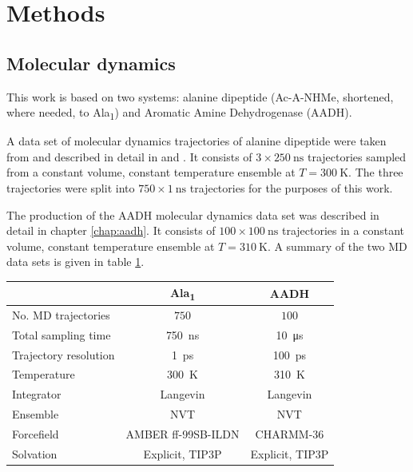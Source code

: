 
\section{Methods}\label{sec:methods}
\subsection{Molecular dynamics}
This work is based on two systems: alanine dipeptide (Ac-A-NHMe, shortened, where needed, to Ala\textsubscript{1}) and Aromatic Amine Dehydrogenase (AADH). 

 A data set of molecular dynamics trajectories of alanine dipeptide were taken from \cite{wehmeyerTimelaggedAutoencodersDeep2018a} and described in detail in \cite{nuskeMarkovStateModels2017b} and \cite{harveyACEMDAcceleratingBiomolecular2009}.  It consists of $3\times \SI{250}{\nano\second}$ trajectories sampled from a constant volume, constant temperature ensemble at $T=\SI{300}{\kelvin}$. The three trajectories were split into $750\times\SI{1}{\nano\second}$ trajectories for the purposes of this work. 
 
The production of the AADH molecular dynamics data set was described in detail in chapter \ref{chap:aadh}.  It consists of $100\times \SI{100}{\nano\second}$ trajectories in a constant volume, constant temperature ensemble at $T=\SI{310}{\kelvin}$. A summary of the two MD data sets is given in table \ref{tab:md_specs}. 

\begin{table}
    \centering
    \begin{tabular}{|l|c|c|}
        \hline
         & Ala\textsubscript{1} & AADH \\
         \hline\hline
         No. MD trajectories & $750$ & $100$ \\
         Total sampling time & \SI{750}{\nano\second} & \SI{10}{\micro\second} \\
         Trajectory resolution & \SI{1}{\pico\second} & \SI{100}{\pico\second} \\
         Temperature & \SI{300}{\kelvin} & \SI{310}{\kelvin} \\
         Integrator & Langevin & Langevin \\
         Ensemble & NVT & NVT \\
         Forcefield & AMBER ff-99SB-ILDN & CHARMM-36 \\
         Solvation & Explicit, TIP3P & Explicit, TIP3P \\
         \hline
    \end{tabular}
    \label{tab:md_specs}
\end{table}

